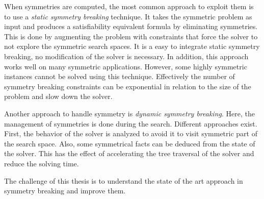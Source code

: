 When symmetries are computed, the most common approach to exploit them is to use a \emph{static symmetry breaking} technique.
It takes the symmetric problem as input and produces a satisfiability equivalent formula by eliminating symmetries. This is done by augmenting the problem with constraints that force the solver to not explore the symmetric search  spaces. It is a easy to integrate static symmetry breaking, no modification of the solver is necessary.
In addition, this approach works well on many symmetric applications.
However, some highly symmetric instances cannot be solved using this technique. Effectively the number of
symmetry breaking constraints can be exponential in relation to the size of the problem and slow down the solver.

Another approach to handle symmetry is \emph{dynamic symmetry breaking}. Here, the management of
symmetries is done during the search. Different approaches exist. First, the behavior of the solver is analyzed to avoid it to visit symmetric part of the search space. Also, some symmetrical facts can be deduced from the
state of the solver. This has the effect of accelerating the tree traversal of the solver and reduce the solving time.

The challenge of this thesis is to understand the state of  the art approach in symmetry breaking and
improve them.
%
%
%
%
%
%



